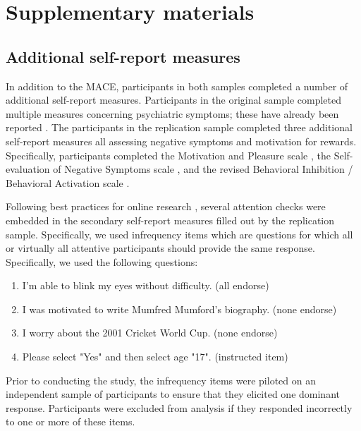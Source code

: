 \documentclass[letterpaper,man,natbib,floatsintext,longtable]{apa6}
\begin{document}


\pagebreak
\section{Supplementary materials}

\setcounter{figure}{0}
\setcounter{table}{0}
\renewcommand{\thetable}{S\arabic{table}}
\renewcommand{\thefigure}{S\arabic{figure}}

\subsection*{Additional self-report measures}

In addition to the MACE, participants in both samples completed a number of additional self-report measures. Participants in the original sample completed multiple measures concerning psychiatric symptoms; these have already been reported \citep{teicher2015maltreatment}. The participants in the replication sample completed three additional self-report measures all assessing negative symptoms and motivation for rewards. Specifically, participants completed the Motivation and Pleasure scale \citep{llerena2013motivation}, the Self-evaluation of Negative Symptoms scale \citep{dollfus2016self}, and the revised Behavioral Inhibition / Behavioral Activation scale \citep{pagliaccio2016revising}.

Following best practices for online research \citep{zorowitz2021inattentive}, several attention checks were embedded in the secondary self-report measures filled out by the replication sample. Specifically, we used infrequency items which are questions for which all  or virtually all attentive participants should provide the same response. Specifically, we used the following questions:

\begin{enumerate}
    \item I'm able to blink my eyes without difficulty. (all endorse)
    \item I was motivated to write Mumfred Mumford's biography. (none endorse)
    \item I worry about the 2001 Cricket World Cup. (none endorse)
    \item Please select "Yes" and then select age "17". (instructed item)
\end{enumerate}

\noindent Prior to conducting the study, the infrequency items were piloted on an independent sample of participants to ensure that they elicited one dominant response. Participants were excluded from analysis if they responded incorrectly to one or more of these items.
\end{document}
